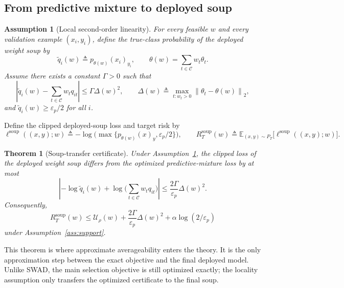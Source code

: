 \documentclass{article}
\newtheorem{theorem}{Theorem}
\newtheorem{assumption}{Assumption}
\newcommand{\EE}{\mathbb{E}}
\newcommand{\cC}{\mathcal{C}}
\newcommand{\swad}{\textup{\textsc{SWAD}}}
\newcommand{\norm}[1]{\left\lVert #1 \right\rVert}
\begin{document}
\subsection{From predictive mixture to deployed soup}

\begin{assumption}[Local second-order linearity]
\label{ass:locality}
For every feasible $w$ and every validation example $(x_i,y_i)$, define the true-class probability of the deployed weight soup by
\[
    \widetilde q_i(w) \triangleq p_{\theta(w)}(x_i)_{y_i},
    \qquad
    \theta(w)=\sum_{t\in\cC} w_t\theta_t.
    \]
Assume there exists a constant $\Gamma>0$ such that
\begin{equation}
    |\widetilde q_i(w)-\sum_{t\in\cC} w_t q_{it}|
    \le
    \Gamma \Delta(w)^2,
    \qquad
    \Delta(w)\triangleq \max_{t:w_t>0}\norm{\theta_t-\theta(w)}_2,
    \label{eq:locality_assumption}
\end{equation}
and $\widetilde q_i(w)\ge \varepsilon_p/2$ for all $i$.
\end{assumption}

Define the clipped deployed-soup loss and target risk by
\begin{equation}
    \ell^{\mathrm{soup}}((x,y);w)
    \triangleq
    -\log\!\Big(\max\{p_{\theta(w)}(x)_y,\varepsilon_p/2\}\Big),
    \qquad
    R_T^{\mathrm{soup}}(w)
    \triangleq
    \EE_{(x,y)\sim P_T}\big[\ell^{\mathrm{soup}}((x,y);w)\big].
    \label{eq:soup_loss_def}
\end{equation}

\begin{theorem}[Soup-transfer certificate]
\label{thm:soup_transfer}
Under Assumption~\ref{ass:locality}, the clipped loss of the deployed weight soup differs from the optimized predictive-mixture loss by at most
\begin{equation}
    \left|
        -\log \widetilde q_i(w)
        +
        \log\!\Big(\sum_{t\in\cC} w_t q_{it}\Big)
    \right|
    \le
    \frac{2\Gamma}{\varepsilon_p}\Delta(w)^2.
    \label{eq:loss_gap}
\end{equation}
Consequently,
\begin{equation}
    R_T^{\mathrm{soup}}(w)
    \le
    \mathcal U_{\rho}(w)
    +
    \frac{2\Gamma}{\varepsilon_p}\Delta(w)^2
    +
    \alpha \log(2/\varepsilon_p)
    \label{eq:soup_certificate}
\end{equation}
under Assumption~\ref{ass:support}.
\end{theorem}

This theorem is where approximate averageability enters the theory. It is the only approximation step between the exact objective and the final deployed model. Unlike \swad{}, the main selection objective is still optimized exactly; the locality assumption only transfers the optimized certificate to the final soup.
\end{document}
